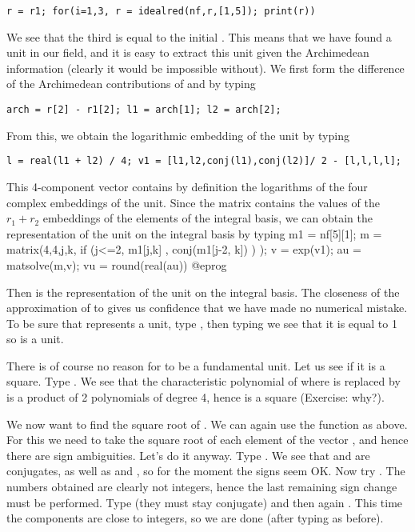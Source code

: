 \centerline{\tt r = r1; for(i=1,3, r = idealred(nf,r,[1,5]); print(r))}

We see that the third  is equal to the initial . This means
that we have found a unit in our field, and it is easy to extract this unit
given the Archimedean information (clearly it would be impossible without).
We first form the difference of the Archimedean contributions of  and
 by typing

\centerline{\tt arch = r[2] - r1[2]; l1 = arch[1]; l2 = arch[2];}

From this, we obtain the logarithmic embedding of the unit by typing

\centerline{\tt l = real(l1 + l2) / 4;
                v1 = [l1,l2,conj(l1),conj(l2)]\til / 2 - [l,l,l,l]\til; }

This 4-component vector contains by definition the logarithms of the
four complex embeddings of the unit. Since the matrix 
contains the values of the $r_1+r_2$ embeddings of the elements of the
integral basis, we can obtain the representation of the unit on the
integral basis by typing
\bprog
{
  m1 = nf[5][1];
  m = matrix(4,4,j,k,
    if (j<=2,
      m1[j,k]
    ,
      conj(m1[j-2, k])
    )
  );
  v = exp(v1);
  au = matsolve(m,v);
  vu = round(real(au))
}
@eprog

Then  is the representation of the unit on the integral basis.
The closeness of the approximation of  to  gives us
confidence that we have made no numerical mistake. To be sure that 
represents a unit, type , then typing
 we see that it is equal to 1 so  is a unit.

There is of course no reason for  to be a fundamental unit. Let us see
if it is a square. Type .
We see that the characteristic polynomial of  where  is
replaced by  is a product of 2 polynomials of degree 4, hence
 is a square (Exercise: why?).

We now want to find the square root of . We can again use the
 function as above. For this we need to take the square
root of each element of the vector , and hence there are
sign ambiguities. Let's do it anyway. Type . We see that
 and  are conjugates, as well as  and ,
so for the moment the signs seem OK. Now try . The
numbers obtained are clearly not integers, hence the last remaining sign
change must be performed. Type  (they must
stay conjugate) and then again . This time the
components are close to integers, so we are done (after typing
 as before).


